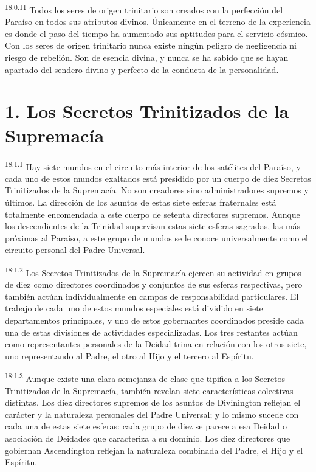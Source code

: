 \par
\textsuperscript{18:0.11} Todos los seres de origen trinitario son creados con la perfección del Paraíso en todos sus atributos divinos. Únicamente en el terreno de la experiencia es donde el paso del tiempo ha aumentado sus aptitudes para el servicio cósmico. Con los seres de origen trinitario nunca existe ningún peligro de negligencia ni riesgo de rebelión. Son de esencia divina, y nunca se ha sabido que se hayan apartado del sendero divino y perfecto de la conducta de la personalidad.

\section*{1. Los Secretos Trinitizados de la Supremacía}
\par
\textsuperscript{18:1.1} Hay siete mundos en el circuito más interior de los satélites del Paraíso, y cada uno de estos mundos exaltados está presidido por un cuerpo de diez Secretos Trinitizados de la Supremacía. No son creadores sino administradores supremos y últimos. La dirección de los asuntos de estas siete esferas fraternales está totalmente encomendada a este cuerpo de setenta directores supremos. Aunque los descendientes de la Trinidad supervisan estas siete esferas sagradas, las más próximas al Paraíso, a este grupo de mundos se le conoce universalmente como el circuito personal del Padre Universal.

\par
\textsuperscript{18:1.2} Los Secretos Trinitizados de la Supremacía ejercen su actividad en grupos de diez como directores coordinados y conjuntos de sus esferas respectivas, pero también actúan individualmente en campos de responsabilidad particulares. El trabajo de cada uno de estos mundos especiales está dividido en siete departamentos principales, y uno de estos gobernantes coordinados preside cada una de estas divisiones de actividades especializadas. Los tres restantes actúan como representantes personales de la Deidad trina en relación con los otros siete, uno representando al Padre, el otro al Hijo y el tercero al Espíritu.

\par
\textsuperscript{18:1.3} Aunque existe una clara semejanza de clase que tipifica a los Secretos Trinitizados de la Supremacía, también revelan siete características colectivas distintas. Los diez directores supremos de los asuntos de Divinington reflejan el carácter y la naturaleza personales del Padre Universal; y lo mismo sucede con cada una de estas siete esferas: cada grupo de diez se parece a esa Deidad o asociación de Deidades que caracteriza a su dominio. Los diez directores que gobiernan Ascendington reflejan la naturaleza combinada del Padre, el Hijo y el Espíritu.

